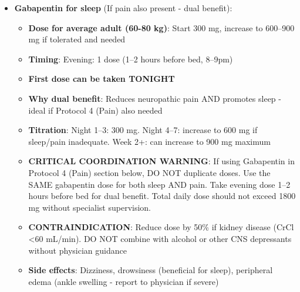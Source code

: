 \begin{enumerate}
\begin{itemize}
        \item \textbf{Gabapentin for sleep} (If pain also present - dual benefit):
        \begin{itemize}
            \item \textbf{Dose for average adult (60-80 kg)}: Start 300 mg, increase to 600--900 mg if tolerated and needed
            \item \textbf{Timing}: Evening: 1 dose (1--2 hours before bed, 8--9pm)
            \item \textbf{First dose can be taken TONIGHT}
            \item \textbf{Why dual benefit}: Reduces neuropathic pain AND promotes sleep - ideal if Protocol 4 (Pain) also needed
            \item \textbf{Titration}: Night 1--3: 300 mg. Night 4--7: increase to 600 mg if sleep/pain inadequate. Week 2+: can increase to 900 mg maximum
            \item \textbf{CRITICAL COORDINATION WARNING}: If using Gabapentin in Protocol 4 (Pain) section below, DO NOT duplicate doses. Use the SAME gabapentin dose for both sleep AND pain. Take evening dose 1--2 hours before bed for dual benefit. Total daily dose should not exceed 1800 mg without specialist supervision.
            \item \textbf{CONTRAINDICATION}: Reduce dose by 50\% if kidney disease (CrCl <60 mL/min). DO NOT combine with alcohol or other CNS depressants without physician guidance
            \item \textbf{Side effects}: Dizziness, drowsiness (beneficial for sleep), peripheral edema (ankle swelling - report to physician if severe)
        \end{itemize}


\end{itemize}
\end{enumerate}
